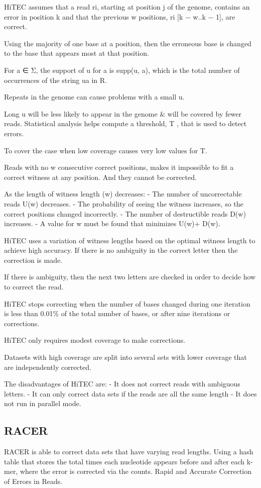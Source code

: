 \documentclass{llncs}
\begin{document}
HiTEC assumes that a read ri, starting at position j of the genome, contains an error in position k and that the previous w positions, ri [k − w..k − 1], are correct. 

Using the majority of one base at a position, then the erroneous base is changed to the base that appears most at that position. 

For a ∈ Σ, the support of u for a is supp(u, a), which is the total number of occurrences of the string ua in R.

Repeats in the genome can cause problems with a small u.

Long u will be less likely to appear in the genome \& will be covered by fewer reads.
Statistical analysis helps compute a threshold, T , that is used to detect errors. 

To cover the case when low coverage causes very low values for T.

Reads with no w consecutive correct positions, makes it impossible to fit a correct witness at any position. And they cannot be corrected.

As the length of witness length (w) decreases:
- The number of uncorrectable reads U(w) decreases.
- The probability of seeing the witness increases, so the correct positions changed incorrectly. 
- The number of destructible reads D(w) increases.
- A value for w must be found that minimizes U(w)+ D(w). 

HiTEC uses a variation of witness lengths based on the optimal witness length to achieve high accuracy.
If there is no ambiguity in the correct letter then the correction is made.

If there is ambiguity, then the next two letters are checked in order to decide how to correct the read.

HiTEC stops correcting when the number of bases changed during one iteration is less than 0.01\% of the total number of bases, or after nine iterations or corrections.

HiTEC only requires modest coverage to make corrections.

Datasets with high coverage are split into several sets with lower coverage that are independently corrected. 

The disadvantages of HiTEC are:
- It does not correct reads with ambiguous letters.
- It can only correct data sets if the reads are all the same length
- It does not run in parallel mode.

\subsection{RACER}
RACER \cite{Racer} is able to correct data sets that have varying read lengths. Using a hash table that stores the total times each nucleotide appears before and after each k-mer, where the error is corrected via the counts.
Rapid and Accurate Correction of Errors in Reads.
\end{document}
